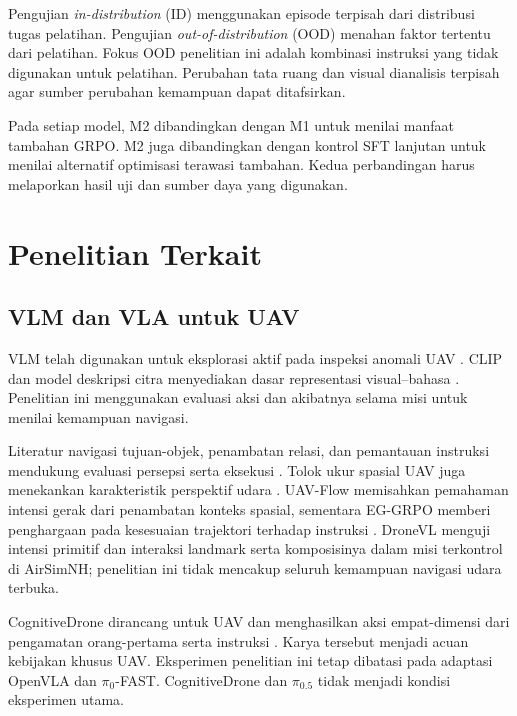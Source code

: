 Pengujian \textit{in-distribution} (ID) menggunakan episode terpisah dari distribusi tugas pelatihan. Pengujian \textit{out-of-distribution} (OOD) menahan faktor tertentu dari pelatihan. Fokus OOD penelitian ini adalah kombinasi instruksi yang tidak digunakan untuk pelatihan. Perubahan tata ruang dan visual dianalisis terpisah agar sumber perubahan kemampuan dapat ditafsirkan.

Pada setiap model, M2 dibandingkan dengan M1 untuk menilai manfaat tambahan GRPO. M2 juga dibandingkan dengan kontrol SFT lanjutan untuk menilai alternatif optimisasi terawasi tambahan. Kedua perbandingan harus melaporkan hasil uji dan sumber daya yang digunakan.

\section{Penelitian Terkait}
\label{sec:penelitian_terkait}
\subsection{VLM dan VLA untuk UAV}
VLM telah digunakan untuk eksplorasi aktif pada inspeksi anomali UAV \citep{wal2026active}. CLIP dan model deskripsi citra menyediakan dasar representasi visual--bahasa \citep{radford2021clip,vinyals2015show}. Penelitian ini menggunakan evaluasi aksi dan akibatnya selama misi untuk menilai kemampuan navigasi. %

Literatur navigasi tujuan-objek, penambatan relasi, dan pemantauan instruksi mendukung evaluasi persepsi serta eksekusi \citep{ayala2024uav,zhang2022explicit,ma2019selfmonitoring}. Tolok ukur spasial UAV juga menekankan karakteristik perspektif udara \citep{zhang2025skyready}. UAV-Flow memisahkan pemahaman intensi gerak dari penambatan konteks spasial, sementara EG-GRPO memberi penghargaan pada kesesuaian trajektori terhadap instruksi \citep{wang2025uavflow,chen2026eggrpo}. DroneVL menguji intensi primitif dan interaksi landmark serta komposisinya dalam misi terkontrol di AirSimNH; penelitian ini tidak mencakup seluruh kemampuan navigasi udara terbuka. %

CognitiveDrone dirancang untuk UAV dan menghasilkan aksi empat-dimensi dari pengamatan orang-pertama serta instruksi \citep{lykov2025cognitivedrone}. Karya tersebut menjadi acuan kebijakan khusus UAV. Eksperimen penelitian ini tetap dibatasi pada adaptasi OpenVLA dan $\pi_0$-FAST. CognitiveDrone dan $\pi_{0.5}$ tidak menjadi kondisi eksperimen utama.

